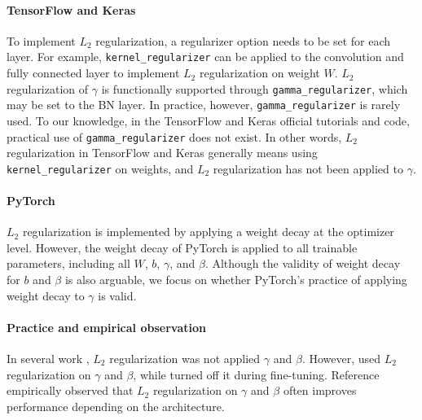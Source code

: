 \documentclass{article}
\begin{document}
\paragraph{TensorFlow and Keras} To implement $L_2$ regularization, a regularizer option needs to be set for each layer. For example, \texttt{kernel\_regularizer} can be applied to the convolution and fully connected layer to implement $L_2$ regularization on weight $W$. $L_2$ regularization of $\gamma$ is functionally supported through \texttt{gamma\_regularizer}, which may be set to the BN layer. In practice, however, \texttt{gamma\_regularizer} is rarely used. To our knowledge, in the TensorFlow and Keras official tutorials and code, practical use of \texttt{gamma\_regularizer} does not exist. In other words, $L_2$ regularization in TensorFlow and Keras generally means using \texttt{kernel\_regularizer} on weights, and $L_2$ regularization has not been applied to $\gamma$.
\paragraph{PyTorch} $L_2$ regularization is implemented by applying a weight decay at the optimizer level. However, the weight decay of PyTorch is applied to all trainable parameters, including all $W$, $b$, $\gamma$, and $\beta$. Although the validity of weight decay for $b$ and $\beta$ is also arguable, we focus on whether PyTorch's practice of applying weight decay to $\gamma$ is valid.
\paragraph{Practice and empirical observation} In several work \cite{cvpr/HeZ0ZXL19,corr/abs-1807-11205,gcorr/GoyalDGNWKTJH17}, $L_2$ regularization was not applied $\gamma$ and $\beta$. However, \cite{ijcv/WuH20,iclr/YanWZ0W020} used $L_2$ regularization on $\gamma$ and $\beta$, while \cite{ijcv/WuH20} turned off it during fine-tuning. Reference \cite{iclr/SummersD20} empirically observed that $L_2$ regularization on $\gamma$ and $\beta$ often improves performance depending on the architecture.
\end{document}
